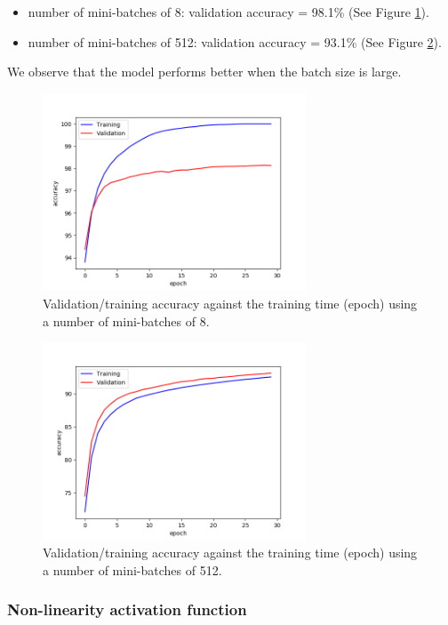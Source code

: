 \documentclass[a4paper]{article}
\begin{document}
\begin{enumerate}
\begin{itemize}
\item number of mini-batches of 8: validation accuracy = 98.1\% (See Figure \ref{fig:batch2}).

\item number of mini-batches of 512: validation accuracy = 93.1\% (See Figure \ref{fig:batch3}).  
  
\end{itemize}
We observe that the model performs better when the batch size is large.
\begin{figure}
\centering
\includegraphics[width=0.7\textwidth]{batch2.png}
\caption{\label{fig:batch2}Validation/training accuracy against the training time (epoch) using a number of mini-batches of 8.}
\end{figure}

\begin{figure}
\centering
\includegraphics[width=0.7\textwidth]{batch3.png}
\caption{\label{fig:batch3}Validation/training accuracy against the training time (epoch) using a number of mini-batches of 512.}
\end{figure}

\subsubsection{Non-linearity activation function}



\end{enumerate}
\end{document}
